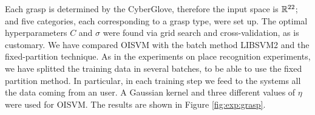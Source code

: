 


Each grasp is determined by the CyberGlove, therefore the input space
is $\mathbb{R}^{22}$; and five categories, each corresponding to a grasp
type, were set up. The optimal hyperparameters $C$ and $\sigma$ were
found via grid search and cross-validation, as is customary.
We have compared OISVM with the batch method LIBSVM2 and the fixed-partition
technique. As in the experiments on place recognition experiments,
we have splitted the training data in several batches, to be able to use
the fixed partition method. In particular, in each training step we feed to
the systems all the data coming from an user.
A Gaussian kernel and three
different values of $\eta$ were used for OISVM. The results are shown
in Figure \ref{fig:exp:grasp}.

